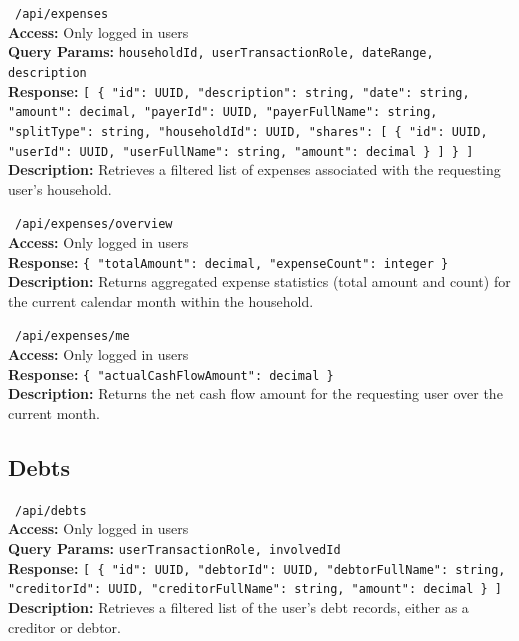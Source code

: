 \vspace{0.3cm}
\noindent \apiGET\ \texttt{/api/expenses} \\
\textbf{Access:} Only logged in users \\
\textbf{Query Params:} \texttt{householdId, userTransactionRole, dateRange, description} \\
\textbf{Response:} \texttt{[ \{ "id": UUID, "description": string, "date": string, "amount": decimal, "payerId": UUID, "payerFullName": string, "splitType": string, "householdId": UUID, "shares": [ \{ "id": UUID, "userId": UUID, "userFullName": string, "amount": decimal \} ] \} ]} \\
\textbf{Description:} Retrieves a filtered list of expenses associated with the requesting user's household.

\vspace{0.3cm}
\noindent \apiGET\ \texttt{/api/expenses/overview} \\
\textbf{Access:} Only logged in users \\
\textbf{Response:} \texttt{\{ "totalAmount": decimal, "expenseCount": integer \}} \\
\textbf{Description:} Returns aggregated expense statistics (total amount and count) for the current calendar month within the household.

\vspace{0.3cm}
\noindent \apiGET\ \texttt{/api/expenses/me} \\
\textbf{Access:} Only logged in users \\
\textbf{Response:} \texttt{\{ "actualCashFlowAmount": decimal \}} \\
\textbf{Description:} Returns the net cash flow amount for the requesting user over the current month.

\subsection{Debts}

\vspace{0.3cm}
\noindent \apiGET\ \texttt{/api/debts} \\
\textbf{Access:} Only logged in users \\
\textbf{Query Params:} \texttt{userTransactionRole, involvedId} \\
\textbf{Response:} \texttt{[ \{ "id": UUID, "debtorId": UUID, "debtorFullName": string, "creditorId": UUID, "creditorFullName": string, "amount": decimal \} ]} \\
\textbf{Description:} Retrieves a filtered list of the user's debt records, either as a creditor or debtor.

